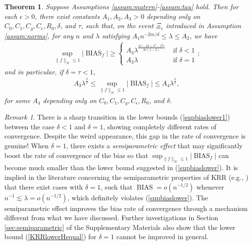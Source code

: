 \documentclass[12pt]{article}
\theoremstyle{plain}
\newtheorem{theorem}{Theorem}
\theoremstyle{remark}
\newtheorem{remark}{Remark}
\begin{document}
\begin{theorem}\label{Coro:biasrate}
    Suppose Assumptions \ref{assum:matern}-\ref{assum:tau} hold. Then for each $\epsilon>0$, there exist constants $A_1,A_2,A_3>0$ depending only on $C_0,C_1,C_g,C_\epsilon,R_0,\delta$, and $\tau$, such that, on the event $\Xi_\epsilon$ introduced in Assumption \ref{assum:norms}, for any $n$ and $\lambda$ satisfying $A_1n^{-2m/d}\leq \lambda \leq A_2$, we have
    \begin{eqnarray}\label{supbiaslower1}
        \sup_{\|f\|_\mathcal{H}\leq 1}|\operatorname{BIAS}_f|\geq\begin{cases}
               A_3 \lambda^{\frac{2\tau-2\delta+\delta^2-\delta^2\tau}{2\tau(1-\delta)}} & \text{ if } \delta<1\\
               A_3 \lambda & \text{ if } \delta=1
           \end{cases};
    \end{eqnarray}
    and in particular, if $\delta=\tau<1$, 
    \begin{eqnarray}\label{supbiaslower}
        A_3\lambda^\frac{\delta}{2}\leq \sup_{\|f\|_\mathcal{H}\leq 1}|\operatorname{BIAS}_f|\leq A_4\lambda^\frac{\delta}{2},
    \end{eqnarray}
    for some $A_4$ depending only on $C_0,C_1,C_g,C_\epsilon,R_0$, and $\delta$.
\end{theorem}

\begin{remark}
There is a sharp transition in the lower bounds (\ref{supbiaslower1}) between the case $\delta<1$ and $\delta=1$, 
showing completely different rates of convergence. Despite the weird appearance, this gap in the rate of convergence is genuine! When $\delta=1$, there exists a \textit{semiparametric effect} that may significantly boost the rate of convergence of the bias so that $\sup_{\|f\|_\mathcal{H}\leq 1}|\operatorname{BIAS}_f|$ can become much smaller than the lower bound suggested in (\ref{supbiaslower}). It is implied in the literature concerning the semiparametric properties of KRR (e.g., \cite{mammen1997penalized,tuo2015efficient,geer2000empirical}) that there exist cases with $\delta=1$, such that $\operatorname{BIAS}=o(n^{-1/2})$ whenever $n^{-1}\lesssim\lambda=o(n^{-1/2})$, which definitely violates (\ref{supbiaslower}). The semiparametric effect improves the bias rate of convergence through a mechanism different from what we have discussed.
Further investigations in Section \ref{sec:semiparametric} of the Supplementary Materials also show that the lower bound (\ref{KRRlowerHequal}) for $\delta=1$ cannot be improved in general.     
\end{remark}
\end{document}

